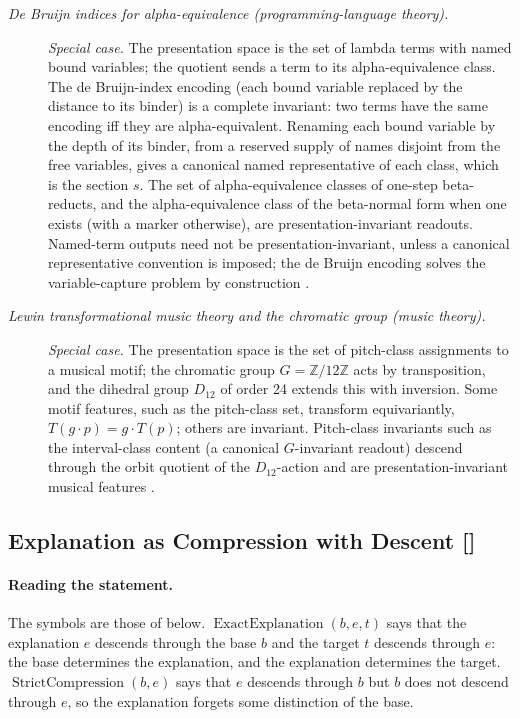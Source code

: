 \begin{description}
\item[\emph{De Bruijn indices for alpha-equivalence
(programming-language theory).}] \textit{Special case.}
The presentation space is the set of lambda terms with
named bound variables; the quotient sends a term to its
alpha-equivalence class.  The de Bruijn-index encoding
(each bound variable replaced by the distance to its
binder) is a complete invariant: two terms have the
same encoding iff they are alpha-equivalent.  Renaming
each bound variable by the depth of its binder, from a
reserved supply of names disjoint from the free
variables, gives a canonical named representative of
each class, which is the section \(s\).  The set of alpha-equivalence classes of one-step beta-reducts,
and the alpha-equivalence class of the beta-normal form when
one exists (with a marker otherwise), are presentation-invariant
readouts. Named-term outputs need not be presentation-invariant,
unless a canonical representative convention is imposed; the de Bruijn encoding
solves the variable-capture problem by construction
\citep{deBruijn1972LambdaNotation}.

\item[\emph{Lewin transformational music theory and the
chromatic group (music theory).}] \textit{Special case.}
The presentation space is the set of pitch-class
assignments to a musical motif; the chromatic group
\(G=\mathbb Z/12\mathbb Z\) acts by transposition, and
the dihedral group \(D_{12}\) of order 24 extends this with
inversion.  Some motif features, such as the pitch-class set, transform equivariantly,
\(T(g\cdot p)=g\cdot T(p)\); others are invariant.  Pitch-class invariants
such as the interval-class content (a canonical
\(G\)-invariant readout) descend through the orbit
quotient of the \(D_{12}\)-action and are
presentation-invariant musical features
\citep{Lewin1987GMIT}.
\end{description}
\endgroup

\subsection{Explanation as Compression with Descent [\texorpdfstring{}{F30}]}\label{sec:status-records-coherence:explanation}

\paragraph{Reading the statement.} The symbols are those of  below.
\(\operatorname{ExactExplanation}(b,e,t)\) says that the explanation
\(e\) descends through the base \(b\) and the target \(t\) descends
through \(e\): the base determines the explanation, and the explanation
determines the target. \(\operatorname{StrictCompression}(b,e)\) says
that \(e\) descends through \(b\) but \(b\) does not descend through
\(e\), so the explanation forgets some distinction of the base.


